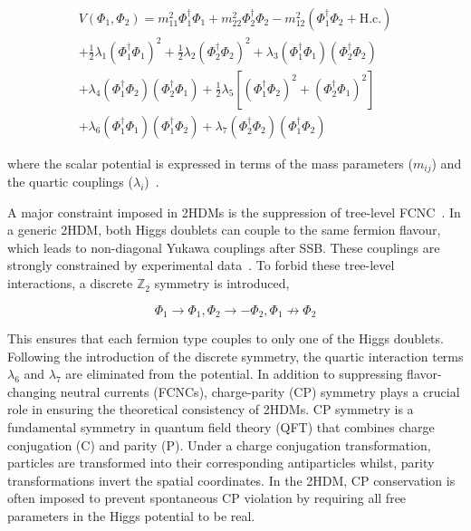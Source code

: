 \begin{equation}
\begin{array}{c}
    V(\Phi_1,\Phi_2) = m_{11}^2 \Phi_1^{\dagger}\Phi_1 + m_{22}^2 \Phi_2^{\dagger}\Phi_2 - m_{12}^2(\Phi_1^\dagger\Phi_2 + \text{H.c.}) \\
    + \frac{1}{2} \lambda_1(\Phi_1^\dagger\Phi_1)^2 + \frac{1}{2}\lambda_2(\Phi_2^\dagger\Phi_2)^2 + \lambda_3(\Phi_1^\dagger\Phi_1)(\Phi_2^\dagger\Phi_2) \\
    + \lambda_4(\Phi_1^\dagger\Phi_2)(\Phi_2^\dagger\Phi_1) + \frac{1}{2}\lambda_5[(\Phi_1^\dagger\Phi_2)^2 + (\Phi_2^\dagger\Phi_1)^2] \\
    + \lambda_6(\Phi_1^\dagger\Phi_1)(\Phi_1^\dagger\Phi_2) + \lambda_7(\Phi_2^\dagger\Phi_2)(\Phi_1^\dagger\Phi_2)
\end{array}
\end{equation}

where the scalar potential is expressed in terms of the mass parameters ($m_{ij}$) and the quartic couplings ($\lambda_i$)~\cite{2HDM_1}. 

A major constraint imposed in 2HDMs is the suppression of tree-level \ac{FCNC}~\cite{FCNC_1,2HDM_2}. In a generic 2HDM, both Higgs doublets can couple to the same fermion flavour, which leads to non-diagonal Yukawa couplings after SSB. These couplings are strongly constrained by experimental data~\cite{FCNC_Constraints}. To forbid these tree-level interactions, a discrete $\mathbb{Z}_2$ symmetry \cite{2HDM_2} is introduced, 

\begin{equation}
    \Phi_1 \to \Phi_1, \Phi_2 \to - \Phi_2, \Phi_1 \not\to \Phi_2 
\end{equation}

This ensures that each fermion type couples to only one of the Higgs doublets. Following the introduction of the discrete symmetry, the quartic interaction terms $\lambda_6$ and $\lambda_7$ are eliminated from the potential. In addition to suppressing flavor-changing neutral currents (FCNCs), charge-parity (CP) symmetry plays a crucial role in ensuring the theoretical consistency of 2HDMs. CP symmetry is a fundamental symmetry in quantum field theory (QFT) that combines charge conjugation (C) and parity (P). Under a charge conjugation transformation, particles are transformed into their corresponding antiparticles whilst, parity transformations invert the spatial coordinates. In the 2HDM, CP conservation is often imposed to prevent spontaneous CP violation by requiring all free parameters in the Higgs potential to be real.

